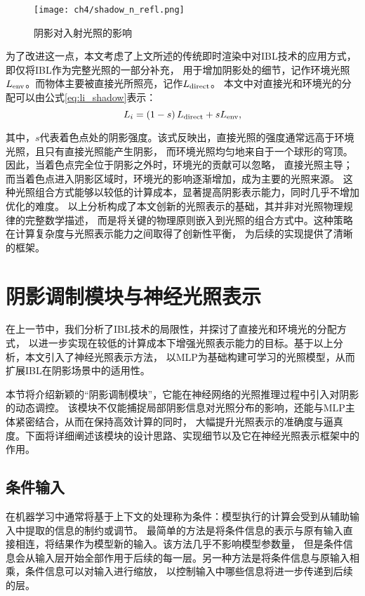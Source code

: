 \begin{figure}[htb]
  \centering
  \texttt{[image: ch4/shadow\_n\_refl.png]}
  \caption{阴影对入射光照的影响}
  \label{fig:shadow_n_refl}
\end{figure}

为了改进这一点，本文考虑了上文所述的传统即时渲染中对IBL技术的应用方式，即仅将IBL作为完整光照的一部分补充，
用于增加阴影处的细节，记作环境光照$L_{\rm{env}}$。而物体主要被直接光所照亮，记作$L_{\rm{direct}}$。
本文中对直接光和环境光的分配可以由公式\eqref{eq:li_shadow}表示：
\begin{equation}
  \label{eq:li_shadow}
  L_i=\left(1-s\right)L_{\rm{direct}}+sL_{\rm{env}},
  \end{equation}

其中，$s$代表着色点处的阴影强度。该式反映出，直接光照的强度通常远高于环境光照，且只有直接光照能产生阴影，
而环境光照均匀地来自于一个球形的穹顶。因此，当着色点完全位于阴影之外时，环境光的贡献可以忽略，
直接光照主导；而当着色点进入阴影区域时，环境光的影响逐渐增加，成为主要的光照来源。
这种光照组合方式能够以较低的计算成本，显著提高阴影表示能力，同时几乎不增加优化的难度。
以上分析构成了本文创新的光照表示的基础，其并非对光照物理规律的完整数学描述，
而是将关键的物理原则嵌入到光照的组合方式中。这种策略在计算复杂度与光照表示能力之间取得了创新性平衡，
为后续的实现提供了清晰的框架。

\section{阴影调制模块与神经光照表示}

在上一节中，我们分析了IBL技术的局限性，并探讨了直接光和环境光的分配方式，
以进一步实现在较低的计算成本下增强光照表示能力的目标。基于以上分析，本文引入了神经光照表示方法，
以MLP为基础构建可学习的光照模型，从而扩展IBL在阴影场景中的适用性。

本节将介绍新颖的“阴影调制模块”，它能在神经网络的光照推理过程中引入对阴影的动态调控。
该模块不仅能捕捉局部阴影信息对光照分布的影响，还能与MLP主体紧密结合，从而在保持高效计算的同时，
大幅提升光照表示的准确度与逼真度。下面将详细阐述该模块的设计思路、实现细节以及它在神经光照表示框架中的作用。

\subsection{条件输入}

在机器学习中通常将基于上下文的处理称为条件：模型执行的计算会受到从辅助输入中提取的信息的制约或调节。
最简单的方法是将条件信息的表示与原有输入直接相连，将结果作为模型新的输入。该方法几乎不影响模型参数量，
但是条件信息会从输入层开始全部作用于后续的每一层。另一种方法是将条件信息与原输入相乘，条件信息可以对输入进行缩放，
以控制输入中哪些信息将进一步传递到后续的层。

